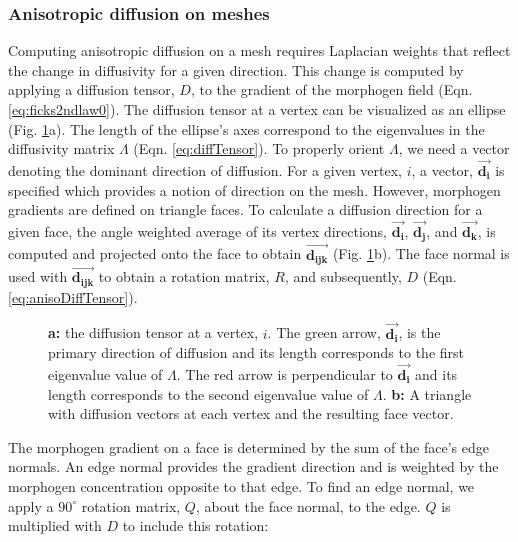 \subsubsection*{Anisotropic diffusion on meshes}


Computing anisotropic diffusion on a mesh requires Laplacian weights that reflect the change in diffusivity for a given direction. This change is computed by applying a diffusion tensor, $D$, to the gradient of the morphogen field (Eqn. \ref{eq:ficks2ndlaw0}). The diffusion tensor at a vertex can be visualized as an ellipse (Fig. \ref{fig:anisoMesh}a). The length of the ellipse's axes correspond to the eigenvalues in the diffusivity matrix $\Lambda$ (Eqn. \ref{eq:diffTensor}). To properly orient $\Lambda$, we need a vector denoting the dominant direction of diffusion. For a given vertex, $i$, a vector, $\boldsymbol{\vec{d_i}}$ is specified which provides a notion of direction on the mesh. However, morphogen gradients are defined on triangle faces. To calculate a diffusion direction for a given face, the angle weighted average of its vertex directions, $\boldsymbol{\vec{d_i}}$, $\boldsymbol{\vec{d_j}}$, and $\boldsymbol{\vec{d_k}}$, is computed and projected onto the face to obtain $\boldsymbol{\vec{d_{ijk}}}$ (Fig. \ref{fig:anisoMesh}b). The face normal is used with $\boldsymbol{\vec{d_{ijk}}}$ to obtain a rotation matrix, $R$, and subsequently, $D$ (Eqn. \ref{eq:anisoDiffTensor}). 
\begin{figure}[H]
	\centering
	\caption{\textbf{a:} the diffusion tensor at a vertex, $i$. The green arrow, $\boldsymbol{\vec{d_i}}$, is the primary direction of diffusion and its length corresponds to the first eigenvalue value of $\Lambda$. The red arrow is perpendicular to $\boldsymbol{\vec{d_i}}$ and its length corresponds to the second eigenvalue value of $\Lambda$. \textbf{b:} A triangle with diffusion vectors at each vertex and the resulting face vector.}
	\label{fig:anisoMesh}
\end{figure}
The morphogen gradient on a face is determined by the sum of the face's edge normals. An edge normal provides the gradient direction and is weighted by the morphogen concentration opposite to that edge. To find an edge normal, we apply a $90^\circ$ rotation matrix, $Q$, about the face normal, to the edge. $Q$ is multiplied with $D$ to include this rotation:
